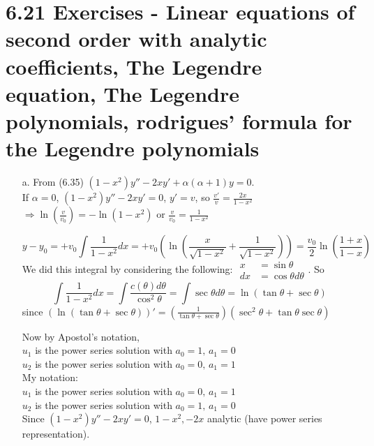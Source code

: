 \documentclass[twoside]{amsart}
\theoremstyle{plain}
\theoremstyle{definition}
\newcommand{\exercisehead}[1]
  {
   \noindent{\small\bf Exercise #1.}
   \smallskip}
\begin{document}
\section*{ 6.21 Exercises - Linear equations of second order with analytic coefficients, The Legendre equation, The Legendre polynomials, rodrigues' formula for the Legendre polynomials }

\exercisehead{1} 
\begin{itemize}
\item[a.]From (6.35) $(1-x^2)y'' - 2xy' + \alpha (\alpha +1) y=0$.  \\
If $\alpha =0$, $(1-x^2)y'' - 2xy' =0$, $y'=v$, so $\frac{v'}{v} = \frac{2x}{1-x^2} $ \, $\Longrightarrow \ln{ \left( \frac{v}{v_0} \right)} = -\ln{ ( 1 - x^2) }$ or $\frac{v}{v_0} = \frac{1}{1-x^2} $

\[
y- y_0 = + v_0 \int \frac{1}{1-x^2} dx = +v_0 \left( \ln{ \left( \frac{x}{\sqrt{ 1-x^2} } + \frac{1}{\sqrt{1- x^2} } \right) }\right) = \frac{v_0}{2} \ln{ \left( \frac{1+x}{1-x} \right) }
\]
We did this integral by considering the following: $\begin{aligned}x &= \sin{\theta} \\ dx & =\cos{\theta} d\theta \end{aligned}$.  So 
\[
\int \frac{1}{1-x^2} dx = \int \frac{ c(\theta) d\theta }{ \cos^2{\theta} } = \int \sec{\theta} d\theta = \ln{ (\tan{\theta} + \sec{\theta} ) }
\] 
since $(\ln{(\tan{\theta} + \sec{\theta} ) } )' = \left( \frac{1}{ \tan{\theta} + \sec{\theta} } \right) (\sec^2{\theta} + \tan{\theta} \sec{\theta} )$

Now by Apostol's notation, \\
$u_1$ is the power series solution with $a_0 =1, \, a_1 =0$ \\ 
$u_2$ is the power series solution with $a_0 =0, \, a_1 =1$ \\

My notation:\\
$u_1$ is the power series solution with $a_0 =0, \, a_1 =1$ \\ 
$u_2$ is the power series solution with $a_0 =1, \, a_1 =0$ \\ 

Since $(1-x^2)y'' - 2xy'=0$, $1-x^2, -2x$ analytic (have power series representation).  


\end{itemize}
\end{document}
